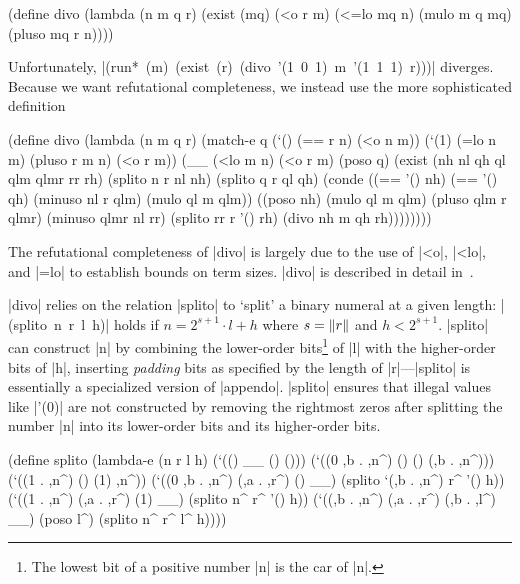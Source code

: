 \schemedisplayspace
\begin{schemedisplay}
(define divo
  (lambda (n m q r)
    (exist (mq)
      (<o r m)
      (<=lo mq n)
      (mulo m q mq)
      (pluso mq r n))))
\end{schemedisplay}

\noindent Unfortunately, 
\mbox{\scheme|(run* (m) (exist (r) (divo '(1 0 1) m '(1 1 1) r)))|}
diverges. Because we want refutational completeness,
we instead use the more sophisticated definition

\schemedisplayspace
\begin{schemedisplay}
(define divo
  (lambda (n m q r)
    (match-e q 
      (`() (== r n) (<o n m))
      (`(1) (=lo n m) (pluso r m n) (<o r m))
      (__ (<lo m n) (<o r m) (poso q)
       (exist (nh nl qh ql qlm qlmr rr rh)
         (splito n r nl nh)
         (splito q r ql qh)
         (conde
           ((== '() nh)
            (== '() qh)
            (minuso nl r qlm)
            (mulo ql m qlm))
           ((poso nh)
            (mulo ql m qlm)
            (pluso qlm r qlmr)
            (minuso qlmr nl rr)
            (splito rr r '() rh)
            (divo nh m qh rh))))))))
\end{schemedisplay}

\noindent The refutational completeness of \scheme|divo| is largely due to the
use of \scheme|<o|, \scheme|<lo|, and \scheme|=lo| to establish bounds
on term sizes. \scheme|divo| is described in detail in~\citet{trs}.

\scheme|divo| relies on the relation \scheme|splito| to `split' a
binary numeral at a given length: \mbox{\scheme|(splito n r l h)|}
holds if $n = 2^{s+1} \cdot l + h$ where $s = \lVert r\rVert$ and $h < 2^{s+1}$.
\scheme|splito| can construct \scheme|n| by combining the lower-order
bits\footnote{The lowest bit of a positive number \mbox{\scheme|n|} is
  the car of \mbox{\scheme|n|}.} of \scheme|l| with
the higher-order bits of \scheme|h|, inserting \emph{padding} bits as
specified by the length of \scheme|r|---\scheme|splito| is essentially
a specialized version of \scheme|appendo|.  \scheme|splito| ensures
that illegal values like \scheme|'(0)| are not constructed by removing
the rightmost zeros after splitting the number \scheme|n| into its
lower-order bits and its higher-order bits.

\schemedisplayspace
\begin{schemedisplay}
(define splito
  (lambda-e (n r l h)
    (`(() __ () ()))
    (`((0 ,b . ,n^) () () (,b . ,n^)))
    (`((1 . ,n^) () (1) ,n^))
    (`((0 ,b . ,n^) (,a . ,r^) () __)
     (splito `(,b . ,n^) r^ '() h))
    (`((1 . ,n^) (,a . ,r^) (1) __)
     (splito n^ r^ '() h))
    (`((,b . ,n^) (,a . ,r^) (,b . ,l^) __)
     (poso l^)
     (splito n^ r^ l^ h))))
\end{schemedisplay}

